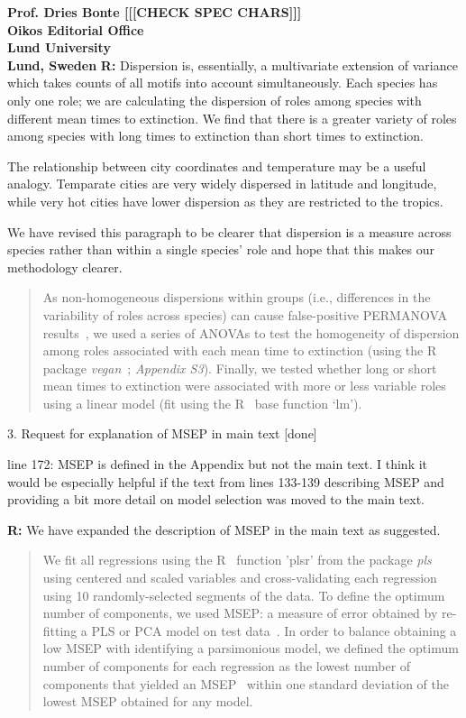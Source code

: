 \documentclass[12pt]{letter}
\begin{document}
\begin{letter}{\bf Prof. Dries Bonte [[[CHECK SPEC CHARS]]]\\
Oikos Editorial Office \\
Lund University \\
Lund, Sweden}
    \textbf{R:} Dispersion is, essentially, a multivariate extension of variance which takes counts of all motifs into account simultaneously. 
    Each species has only one role; we are calculating the dispersion of roles among species with different mean times to extinction. We find that there is a greater variety of roles among species with long times to extinction than short times to extinction. 


    The relationship between city coordinates and temperature may be a useful analogy. Temparate cities are very widely dispersed in latitude and longitude, while very hot cities have lower dispersion as they are restricted to the tropics.


    We have revised this paragraph to be clearer that dispersion is a measure across species rather than within a single species' role and hope that this makes our methodology clearer.


    \begin{quotation}

            As non-homogeneous dispersions within groups (i.e., differences in the variability of roles across species) can cause false-positive PERMANOVA results~\citep{Anderson2001}, we used a series of ANOVAs to test the homogeneity of dispersion among roles associated with each mean time to extinction (using the R~\citep{R} package \emph{vegan}~\citep{vegan}; \emph{Appendix S3}).
            Finally, we tested whether long or short mean times to extinction were associated with more or less variable roles  using a linear model (fit using the R~\citep{R} base function `lm').

    \end{quotation}    


  3. Request for explanation of MSEP in main text [done]

    line 172: MSEP is defined in the Appendix but not the main text. I think it would be especially helpful if the text from lines 133-139 describing MSEP and providing a bit more detail on model selection was moved to the main text.

    \textbf{R:} We have expanded the description of MSEP in the main text as suggested.

    \begin{quotation}

          We fit all regressions using the R~\citep{R} function 'plsr' from the package \emph{pls}~\citep{pls} using centered and scaled variables and cross-validating each regression using 10 randomly-selected segments of the data.
          To define the optimum number of components, we used MSEP: a measure of error obtained by re-fitting a PLS or PCA model on test data~\citep{Mevik2004}.
          In order to balance obtaining a low MSEP with identifying a parsimonious model, we defined the optimum number of components for each regression as the lowest number of components that yielded an MSEP~\citep{Mevik2004} within one standard deviation of the lowest MSEP obtained for any model.


\end{quotation}
\end{letter}
\end{document}
